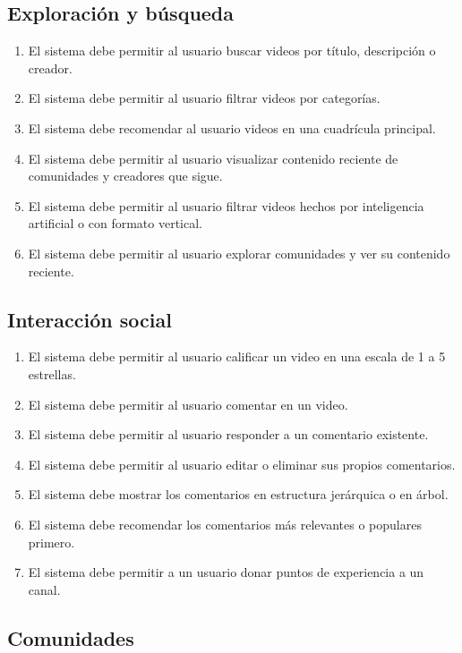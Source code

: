 \subsection{Exploración y búsqueda}

\begin{enumerate}[label=\textbf{RF-EB \arabic*.}, leftmargin=*]
    \item El sistema debe permitir al usuario buscar videos por título, descripción o creador.
    \item El sistema debe permitir al usuario filtrar videos por categorías.
    \item El sistema debe recomendar al usuario videos en una cuadrícula principal.
    \item El sistema debe permitir al usuario visualizar contenido reciente de comunidades y creadores que sigue.
    \item El sistema debe permitir al usuario filtrar videos hechos por inteligencia artificial o con formato vertical. 
    \item El sistema debe permitir al usuario explorar comunidades y ver su contenido reciente.
\end{enumerate}

\subsection{Interacción social}
\begin{enumerate}[label=\textbf{RF-IS \arabic*.}, leftmargin=*]
    \item El sistema debe permitir al usuario calificar un video en una escala de 1 a 5 estrellas.
    \item El sistema debe permitir al usuario comentar en un video.
    \item El sistema debe permitir al usuario responder a un comentario existente.
    \item El sistema debe permitir al usuario editar o eliminar sus propios comentarios.
    \item El sistema debe mostrar los comentarios en estructura jerárquica o en árbol.
    \item El sistema debe recomendar los comentarios más relevantes o populares primero.
    \item El sistema debe permitir a un usuario donar puntos de experiencia a un canal. 
\end{enumerate}

\subsection{Comunidades}


